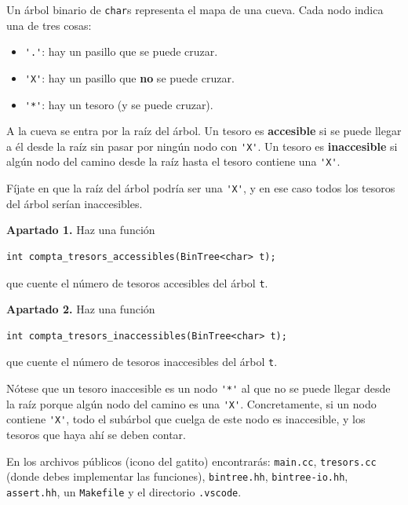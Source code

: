 

\Statement

Un árbol binario de \verb|char|s representa el mapa de una cueva. Cada nodo indica una de tres cosas:

\begin{itemize}
\item \verb|'.'|: hay un pasillo que se puede cruzar.
\item \verb|'X'|: hay un pasillo que \textbf{no} se puede cruzar.
\item \verb|'*'|: hay un tesoro (y se puede cruzar).
\end{itemize}

\medskip

A la cueva se entra por la raíz del árbol. Un tesoro es \textbf{accesible} si se puede llegar a él desde la raíz sin pasar por ningún nodo con \verb|'X'|. Un tesoro es \textbf{inaccesible} si algún nodo del camino desde la raíz hasta el tesoro contiene una \verb|'X'|.

\medskip

Fíjate en que la raíz del árbol podría ser una \verb|'X'|, y en ese caso todos los tesoros del árbol serían inaccesibles.

\medskip

\textbf{Apartado 1.} Haz una función

\begin{verbatim}
int compta_tresors_accessibles(BinTree<char> t);
\end{verbatim}

que cuente el número de tesoros accesibles del árbol \verb|t|.

\medskip

\textbf{Apartado 2.} Haz una función

\begin{verbatim}
int compta_tresors_inaccessibles(BinTree<char> t);
\end{verbatim}

que cuente el número de tesoros inaccesibles del árbol \verb|t|.

\medskip

Nótese que un tesoro inaccesible es un nodo \verb|'*'| al que no se puede llegar desde la raíz porque algún nodo del camino es una \verb|'X'|. Concretamente, si un nodo contiene \verb|'X'|, todo el subárbol que cuelga de este nodo es inaccesible, y los tesoros que haya ahí se deben contar.

\Observation

En los archivos públicos (icono del gatito) encontrarás: \verb|main.cc|, \verb|tresors.cc| (donde debes implementar las funciones), \verb|bintree.hh|, \verb|bintree-io.hh|, \verb|assert.hh|, un \verb|Makefile| y el directorio \verb|.vscode|.

